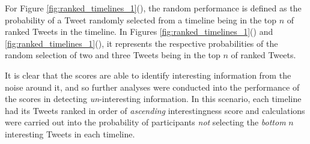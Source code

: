 For Figure \ref{fig:ranked_timelines_1}(), the random performance is defined as the probability of a Tweet randomly selected from a timeline being in the top $n$ of ranked Tweets in the timeline. In Figures \ref{fig:ranked_timelines_1}() and \ref{fig:ranked_timelines_1}(), it represents the respective probabilities of the random selection of two and three Tweets being in the top $n$ of ranked Tweets.

It is clear that the scores are able to identify interesting information from the noise around it, and so further analyses were conducted into the performance of the scores in detecting \textit{un}-interesting information. In this scenario, each timeline had its Tweets ranked in order of \textit{ascending} interestingness score and calculations were carried out into the probability of participants \textit{not} selecting the \textit{bottom} $n$ interesting Tweets in each timeline.

